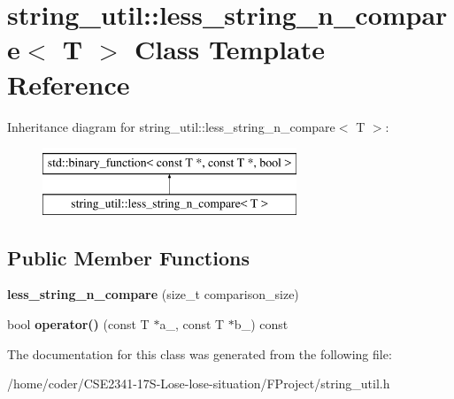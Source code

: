 \section{string\+\_\+util\+:\+:less\+\_\+string\+\_\+n\+\_\+compare$<$ T $>$ Class Template Reference}
\label{classstring__util_1_1less__string__n__compare}
Inheritance diagram for string\+\_\+util\+:\+:less\+\_\+string\+\_\+n\+\_\+compare$<$ T $>$\+:\begin{figure}[H]
\begin{center}
\leavevmode
\includegraphics[height=2.000000cm]{classstring__util_1_1less__string__n__compare}
\end{center}
\end{figure}
\subsection*{Public Member Functions}
\begin{DoxyCompactItemize}
\item 
{\bfseries less\+\_\+string\+\_\+n\+\_\+compare} (size\+\_\+t comparison\+\_\+size)\label{classstring__util_1_1less__string__n__compare_a42b269c0aa27c5ace8b3eeb782f6d335}

\item 
bool {\bfseries operator()} (const T $\ast$a\+\_\+, const T $\ast$b\+\_\+) const \label{classstring__util_1_1less__string__n__compare_ab6f6bb1fbd6421cb848bba88ce18f6e0}

\end{DoxyCompactItemize}


The documentation for this class was generated from the following file\+:\begin{DoxyCompactItemize}
\item 
/home/coder/\+C\+S\+E2341-\/17\+S-\/\+Lose-\/lose-\/situation/\+F\+Project/string\+\_\+util.\+h\end{DoxyCompactItemize}
